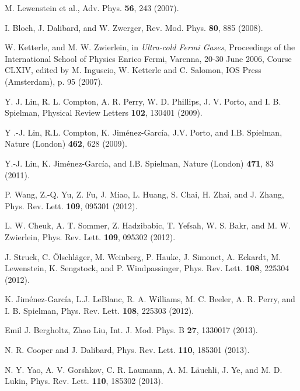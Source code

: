 \documentclass[aps,pra,showpacs,twocolumn,superscriptaddress]{revtex4-1}
\begin{document}
\begin{thebibliography}{11}

 M. Lewenstein et al., Adv. Phys. \textbf{56}, 243 (2007).

 I. Bloch, J. Dalibard, and W. Zwerger, Rev. Mod. Phys. \textbf{80}, 885 (2008).

 W. Ketterle, and M. W. Zwierlein, in {\it Ultra-cold Fermi Gases},
Proceedings of the International School of Physics Enrico Fermi, Varenna, 20-30 June 2006,
Course CLXIV, edited by M. Inguscio, W. Ketterle and C. Salomon, IOS Press (Amsterdam), p. 95 (2007).

 Y. J. Lin, R. L. Compton, A. R. Perry, W. D. Phillips,
       J. V. Porto, and I. B. Spielman, Physical Review Letters \textbf{102}, 130401 (2009).

 Y .-J. Lin, R.L. Compton, K. Jim\'enez-Garc\'ia, J.V. Porto, 
and I.B. Spielman, Nature (London) \textbf{462}, 628 (2009).

 Y.-J. Lin, K. Jim\'enez-Garc\'ia, and I.B. Spielman, Nature (London) \textbf{471}, 83 (2011).

  P. Wang, Z.-Q. Yu, Z. Fu, J. Miao, L. Huang, S. Chai, H. Zhai,
       and J. Zhang, Phys. Rev. Lett. \textbf{109}, 095301 (2012).

 L. W. Cheuk, A. T. Sommer, Z. Hadzibabic, T. Yefsah, W.
       S. Bakr, and M. W. Zwierlein, Phys. Rev. Lett. \textbf{109}, 095302 (2012).

 J. Struck, C. \"Olschl\"ager, M. Weinberg, P. Hauke, J. Simonet, A. Eckardt, M. Lewenstein, K. Sengstock, and P. Windpassinger, 
                         Phys. Rev. Lett. \textbf{108}, 225304 (2012).

 K. Jim\'enez-Garc\'ia, L.J. LeBlanc, R. A. Williams, M. C. Beeler, A. R. Perry, and I. B. Spielman, 
                        Phys. Rev. Lett. \textbf{108}, 225303 (2012). 
                        
 Emil J. Bergholtz, Zhao Liu, Int. J. Mod. Phys. B \textbf{27}, 1330017 (2013). 

 N. R. Cooper and J. Dalibard, Phys. Rev. Lett. \textbf{110}, 185301 (2013).

 N. Y. Yao, A. V. Gorshkov, C. R. Laumann, A. M. Läuchli, J. Ye, and M. D. Lukin,
Phys. Rev. Lett. \textbf{110}, 185302 (2013).                        


\end{thebibliography}
\end{document}
